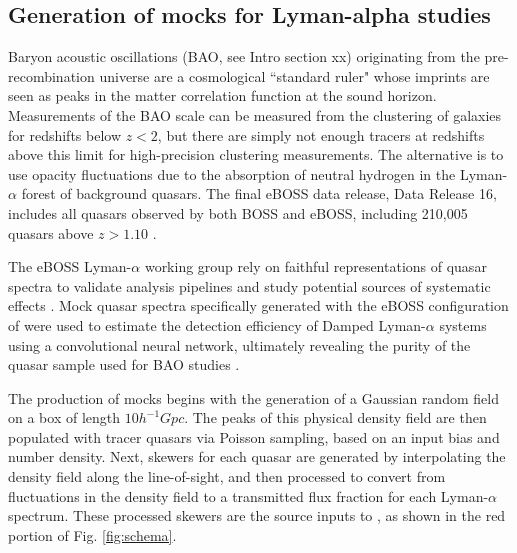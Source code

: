 \subsection{Generation of mocks for Lyman-alpha studies}


Baryon acoustic oscillations (BAO, see Intro section xx) originating from the pre-recombination universe are a cosmological ``standard ruler" whose imprints are seen as peaks in the matter correlation function at the sound horizon. Measurements of the BAO scale can be measured from the clustering of galaxies for redshifts below $z<2$, but there are simply not enough tracers at redshifts above this limit for high-precision clustering measurements. The alternative is to use opacity fluctuations due to the absorption of neutral hydrogen in the Lyman-$\alpha$ forest of background quasars. The final eBOSS data release, Data Release 16, includes all quasars observed by both BOSS and eBOSS, including 210,005 quasars above $z>1.10$ \cite{dMdB20}.

The eBOSS Lyman-$\alpha$ working group rely on faithful representations of quasar spectra to validate analysis pipelines and study potential sources of systematic effects \cite{Farr20}. Mock quasar spectra specifically generated with the eBOSS configuration of  were used to estimate the detection efficiency of Damped Lyman-$\alpha$ systems using a convolutional neural network, ultimately revealing the purity of the quasar sample used for BAO studies \cite{Chabanier21}. 

The production of mocks begins with the generation of a Gaussian random field on a box of length $10 h^{-1} Gpc$. The peaks of this physical density field are then populated with tracer quasars via Poisson sampling, based on an input bias and number density. Next, skewers for each quasar are generated by interpolating the density field along the line-of-sight, and then processed to convert from fluctuations in the density field to a transmitted flux fraction for each Lyman-$\alpha$ spectrum. These processed skewers are the source inputs to , as shown in the red portion of Fig. \ref{fig:schema}.


